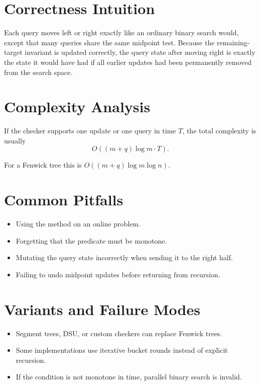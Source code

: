 \section*{Correctness Intuition}

Each query moves left or right exactly like an ordinary binary search would, except that many queries share the same
midpoint test. Because the remaining-target invariant is updated correctly, the query state after moving right is exactly
the state it would have had if all earlier updates had been permanently removed from the search space.

\section*{Complexity Analysis}

If the checker supports one update or one query in time \(T\), the total complexity is usually
\[
O((m+q)\log m \cdot T).
\]

For a Fenwick tree this is \(O((m+q)\log m \log n)\).

\section*{Common Pitfalls}

\begin{itemize}
  \item Using the method on an online problem.
  \item Forgetting that the predicate must be monotone.
  \item Mutating the query state incorrectly when sending it to the right half.
  \item Failing to undo midpoint updates before returning from recursion.
\end{itemize}

\section*{Variants and Failure Modes}

\begin{itemize}
  \item Segment trees, DSU, or custom checkers can replace Fenwick trees.
  \item Some implementations use iterative bucket rounds instead of explicit recursion.
  \item If the condition is not monotone in time, parallel binary search is invalid.
\end{itemize}

